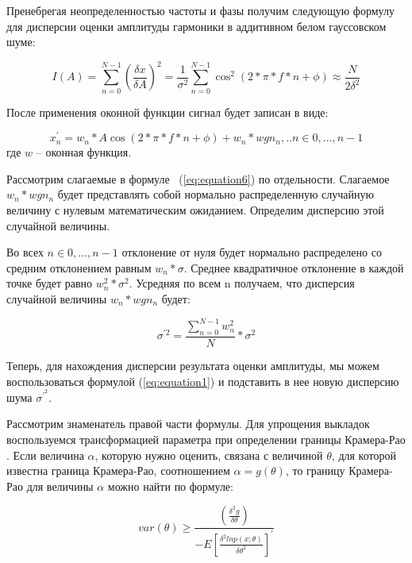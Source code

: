 Пренебрегая неопределенностью частоты и фазы получим следующую формулу для дисперсии оценки амплитуды гармоники в аддитивном белом гауссовском шуме: 

\begin{equation}
	\label{eq:equation5}
	I(A)=\sum_{n=0}^{N-1}\left( \frac{\delta x}{\delta A} \right)^2 =\frac{1}{\sigma^2} \sum_{n=0}^{N-1}\cos^2 (2*\pi*f*n+\phi)\approx \frac{N}{2\delta ^2 }
\end{equation}

После применения оконной функции сигнал будет записан в виде: 

\begin{equation}
	\label{eq:equation6}
	x_n^{'}= w_n*A\cos(2*\pi*f*n+\phi)+w_n*wgn_n,..n\in 0,…,n-1
\end{equation}
где $w$ -- оконная функция.

Рассмотрим слагаемые в формуле ~(\ref{eq:equation6}) по отдельности. Слагаемое $w_n*wgn_n$ будет представлять собой нормально распределенную случайную величину с нулевым математическим ожиданием. Определим дисперсию этой случайной величины.

Во всех $n\in 0,…,n-1$ отклонение от нуля будет нормально распределено со средним отклонением равным $w_n*\sigma$. Среднее квадратичное отклонение в каждой точке будет равно $w_n^2*\sigma^2$. Усредняя по всем n получаем, что дисперсия случайной величины $w_n*wgn_n$ будет: 

\begin{equation}
	\label{eq:equation7}
	\sigma^{'2}=\frac{\sum_{n=0}^{N-1} w_n^2}{N}*\sigma^2
\end{equation}

Теперь, для нахождения дисперсии результата оценки амплитуды, мы можем воспользоваться формулой (\ref{eq:equation1}) и подставить в нее новую дисперсию шума $\sigma^{'^2}$.

Рассмотрим знаменатель правой части формулы. Для упрощения выкладок воспользуемся трансформацией параметра при определении границы Крамера-Рао \cite{kay1993fundamentals,kay2013fundamentals}. Если величина $\alpha$, которую нужно оценить, связана с величиной $\theta$, для которой известна граница Крамера-Рао, соотношением $\alpha=g(\theta)$, то границу Крамера-Рао для величины $\alpha$ можно найти по формуле: 

\begin{equation}
	\label{eq:equation8}
	var(\theta)\geq \frac{\left(\frac{\delta^2 g}{\delta\theta}\right)}{-E\left[\frac{\delta^2 ln p(x;\theta)}{\delta \theta^2}\right]^{'}}
\end{equation}

